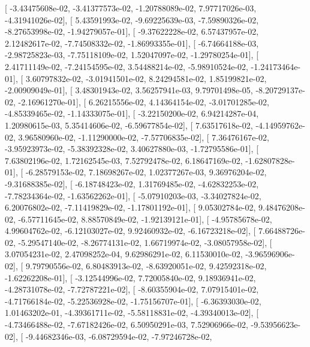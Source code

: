 \documentclass{article}
\begin{document}
       [ -3.43475608e-02,  -3.41377573e-02,  -1.20788089e-02,
          7.97717026e-03,  -4.31941026e-02],
       [  5.43591993e-02,  -9.69225639e-03,  -7.59890326e-02,
         -8.27653998e-02,  -1.94279057e-01],
       [ -9.37622228e-02,   6.57437957e-02,   2.12482617e-02,
         -7.74508332e-02,  -1.86993355e-01],
       [ -6.74664188e-03,  -2.98725823e-03,  -7.75118109e-02,
          1.52047097e-02,  -1.29780254e-01],
       [  2.41711149e-02,  -7.24154595e-02,   3.54488214e-02,
         -5.98910524e-02,  -1.24173464e-01],
       [  3.60797832e-02,  -3.01941501e-02,   8.24294581e-02,
          1.85199821e-02,  -2.00909049e-01],
       [  3.48301943e-02,   3.56257941e-03,   9.79701498e-05,
         -8.20729137e-02,  -2.16961270e-01],
       [  6.26215556e-02,   4.14364154e-02,  -3.01701285e-02,
         -4.85339465e-02,  -1.14333075e-01],
       [ -3.22150200e-02,   6.94214287e-04,   1.20980615e-03,
          5.35414606e-02,  -6.59677854e-02],
       [  7.63517618e-02,  -4.14959762e-02,   3.96580960e-02,
         -1.11290000e-02,  -7.57706835e-02],
       [  7.36476167e-02,  -3.95923973e-02,  -5.38392328e-02,
          3.40627880e-03,  -1.72795586e-01],
       [  7.63802196e-02,   1.72162545e-03,   7.52792478e-02,
          6.18647169e-02,  -1.62807828e-01],
       [ -6.28579153e-02,   7.18698267e-02,   1.02377267e-03,
          9.36976204e-02,  -9.31688385e-02],
       [ -6.18748423e-02,   1.31769485e-02,  -4.62832253e-02,
         -7.78234364e-02,  -1.63562262e-01],
       [ -5.07910203e-03,  -3.34027824e-02,   6.20076802e-02,
         -7.11419829e-02,  -1.17801192e-01],
       [  9.05302784e-02,   9.48476208e-02,  -6.57711645e-02,
          8.88570849e-02,  -1.92139121e-01],
       [ -4.95785678e-02,   4.99604762e-02,  -6.12103027e-02,
          9.92460932e-02,  -6.16723218e-02],
       [  7.66488726e-02,  -5.29547140e-02,  -8.26774131e-02,
          1.66719974e-02,  -3.08057958e-02],
       [  3.07054231e-02,   2.47098252e-04,   9.62986291e-02,
          6.11530010e-02,  -3.96596906e-02],
       [  9.79790556e-02,   6.80483913e-02,  -8.63920051e-02,
          9.42592318e-02,  -1.62262208e-01],
       [ -3.12544996e-02,   7.72005840e-02,   9.18936941e-02,
         -4.28731078e-02,  -7.72787221e-02],
       [ -8.60355904e-02,   7.07915401e-02,  -4.71766184e-02,
         -5.22536928e-02,  -1.75156707e-01],
       [ -6.36393030e-02,   1.01463202e-01,  -4.39361711e-02,
         -5.58118831e-02,  -4.39340013e-02],
       [ -4.73466488e-02,  -7.67182426e-02,   6.50950291e-03,
          7.52906966e-02,  -9.53956623e-02],
       [ -9.44682346e-03,  -6.08729594e-02,  -7.97246728e-02,
\end{document}

